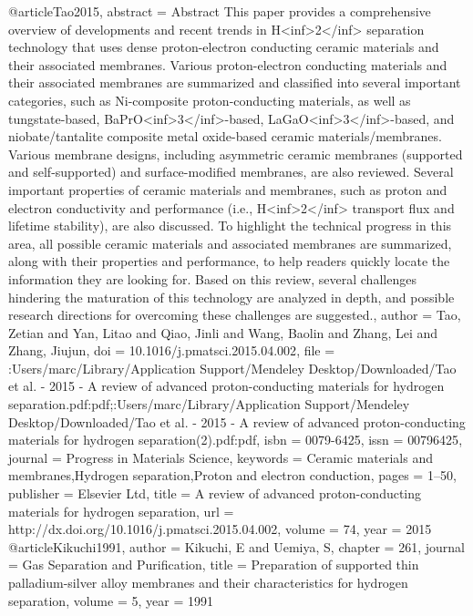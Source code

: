 @article{Tao2015,
abstract = {Abstract This paper provides a comprehensive overview of developments and recent trends in H{\textless}inf{\textgreater}2{\textless}/inf{\textgreater} separation technology that uses dense proton-electron conducting ceramic materials and their associated membranes. Various proton-electron conducting materials and their associated membranes are summarized and classified into several important categories, such as Ni-composite proton-conducting materials, as well as tungstate-based, BaPrO{\textless}inf{\textgreater}3{\textless}/inf{\textgreater}-based, LaGaO{\textless}inf{\textgreater}3{\textless}/inf{\textgreater}-based, and niobate/tantalite composite metal oxide-based ceramic materials/membranes. Various membrane designs, including asymmetric ceramic membranes (supported and self-supported) and surface-modified membranes, are also reviewed. Several important properties of ceramic materials and membranes, such as proton and electron conductivity and performance (i.e., H{\textless}inf{\textgreater}2{\textless}/inf{\textgreater} transport flux and lifetime stability), are also discussed. To highlight the technical progress in this area, all possible ceramic materials and associated membranes are summarized, along with their properties and performance, to help readers quickly locate the information they are looking for. Based on this review, several challenges hindering the maturation of this technology are analyzed in depth, and possible research directions for overcoming these challenges are suggested.},
author = {Tao, Zetian and Yan, Litao and Qiao, Jinli and Wang, Baolin and Zhang, Lei and Zhang, Jiujun},
doi = {10.1016/j.pmatsci.2015.04.002},
file = {:Users/marc/Library/Application Support/Mendeley Desktop/Downloaded/Tao et al. - 2015 - A review of advanced proton-conducting materials for hydrogen separation.pdf:pdf;:Users/marc/Library/Application Support/Mendeley Desktop/Downloaded/Tao et al. - 2015 - A review of advanced proton-conducting materials for hydrogen separation(2).pdf:pdf},
isbn = {0079-6425},
issn = {00796425},
journal = {Progress in Materials Science},
keywords = {Ceramic materials and membranes,Hydrogen separation,Proton and electron conduction},
pages = {1--50},
publisher = {Elsevier Ltd},
title = {{A review of advanced proton-conducting materials for hydrogen separation}},
url = {http://dx.doi.org/10.1016/j.pmatsci.2015.04.002},
volume = {74},
year = {2015}
}
@article{Kikuchi1991,
author = {Kikuchi, E and Uemiya, S},
chapter = {261},
journal = {Gas Separation and Purification},
title = {{Preparation of supported thin palladium-silver alloy membranes and their characteristics for hydrogen separation}},
volume = {5},
year = {1991}
}
